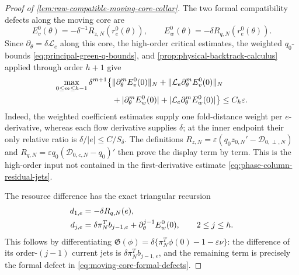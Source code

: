 \begin{proof}[Proof of \cref{lem:raw-compatible-moving-core-collar}]
The two formal compatibility defects along the moving core are
\begin{equation}
 E_v^0(\theta)=-\delta^{-1}R_{z,N}(r_e^0(\theta)),
 \qquad
 E_w^0(\theta)=-\delta R_{q,N}(r_e^0(\theta)).     \label{eq:moving-core-formal-defects}
\end{equation}
Since \(\partial_\theta=\delta\mathcal L_e\) along this core, the
high-order critical estimates, the weighted \(q_0\)-bounds
\cref{eq:principal-green-q-bounds}, and
\cref{prop:physical-backtrack-calculus} applied through order \(h+1\) give
\begin{align}
 \max_{0\le m\le h-1}\delta^{m+1}
 \bigl\{&\|\partial_\theta^mE_v^0(0)\|_N
       +\|\mathcal L_e\partial_\theta^mE_v^0(0)\|_N\notag\\
       &+|\partial_\theta^mE_w^0(0)|
       +|\mathcal L_e\partial_\theta^mE_w^0(0)|\bigr\}
 \le C_h\varepsilon.                              \label{eq:moving-core-formal-defect-jets}
\end{align}
Indeed, the weighted coefficient estimates supply one fold-distance weight
per \(e\)-derivative, whereas each flow derivative supplies \(\delta\); at
the inner endpoint their only relative ratio is
\(\delta/|e|\le C/S_\delta\).  The definitions
\(R_{z,N}=\varepsilon(q_0z_{0,N}'-\mathcal D_{0,\perp,N})\) and
\(R_{q,N}=\varepsilon q_0(\mathcal D_{0,c,N}-q_0)'\) then prove the
display term by term.  This is the high-order input not contained in the
first-derivative estimate \cref{eq:phase-column-residual-jets}.

The resource difference has the exact triangular recursion
\begin{align}
 d_{1,e}&=-\delta R_{q,N}(e),\notag\\
 d_{j,e}&=\delta\pi_N^Tb_{j-1,e}
           +\partial_\theta^{j-1}E_w^0(0),
       \qquad 2\le j\le h.                        \label{eq:moving-core-resource-defect-recursion}
\end{align}
This follows by differentiating
\(\mathfrak G(\phi)=\delta\{\pi_N^T\phi(0)-1-\varepsilon\nu\}\):
the difference of its order-\((j-1)\) current jets is
\(\delta\pi_N^Tb_{j-1,e}\), and the remaining term is precisely the
formal defect in \cref{eq:moving-core-formal-defects}.


\end{proof}
